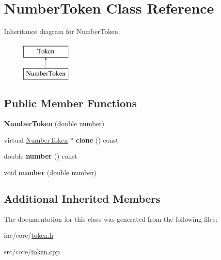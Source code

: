 \hypertarget{classNumberToken}{\section{Number\-Token Class Reference}
\label{classNumberToken}
}
Inheritance diagram for Number\-Token\-:\begin{figure}[H]
\begin{center}
\leavevmode
\includegraphics[height=2.000000cm]{classNumberToken}
\end{center}
\end{figure}
\subsection*{Public Member Functions}
\begin{DoxyCompactItemize}
\item 
\hypertarget{classNumberToken_a2b6ffba5b946b47d6c8ed7152bce78e9}{{\bfseries Number\-Token} (double number)}\label{classNumberToken_a2b6ffba5b946b47d6c8ed7152bce78e9}

\item 
\hypertarget{classNumberToken_a6d52d4b69c1fa1f5cbd182bf6f889d08}{virtual \hyperlink{classNumberToken}{Number\-Token} $\ast$ {\bfseries clone} () const }\label{classNumberToken_a6d52d4b69c1fa1f5cbd182bf6f889d08}

\item 
\hypertarget{classNumberToken_a5caf616bb2eaf58958cc04a8db99d705}{double {\bfseries number} () const }\label{classNumberToken_a5caf616bb2eaf58958cc04a8db99d705}

\item 
\hypertarget{classNumberToken_a52a2337c677a57fcd25df5c2d343d8d1}{void {\bfseries number} (double number)}\label{classNumberToken_a52a2337c677a57fcd25df5c2d343d8d1}

\end{DoxyCompactItemize}
\subsection*{Additional Inherited Members}


The documentation for this class was generated from the following files\-:\begin{DoxyCompactItemize}
\item 
inc/core/\hyperlink{token_8h}{token.\-h}\item 
src/core/\hyperlink{token_8cpp}{token.\-cpp}\end{DoxyCompactItemize}
